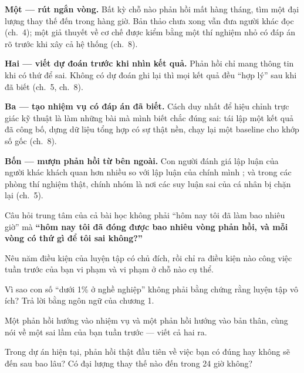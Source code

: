 \documentclass[../hieu-suat.tex]{subfiles}
\begin{document}
\textbf{Một --- rút ngắn vòng.} Bất kỳ chỗ nào phản hồi mất hàng tháng, tìm một đại lượng thay thế đến trong hàng giờ. Bản thảo chưa xong vẫn đưa người khác đọc (ch.~4); một giả thuyết về cơ chế được kiểm bằng một thí nghiệm nhỏ có đáp án rõ trước khi xây cả hệ thống (ch.~8).

\textbf{Hai --- viết dự đoán trước khi nhìn kết quả.} Phản hồi chỉ mang thông tin khi có thứ để sai. Không có dự đoán ghi lại thì mọi kết quả đều ``hợp lý'' sau khi đã biết (ch.~5, ch.~8).

\textbf{Ba --- tạo nhiệm vụ có đáp án đã biết.} Cách duy nhất để hiệu chỉnh trực giác kỹ thuật là làm những bài mà mình biết chắc đúng sai: tái lập một kết quả đã công bố, dựng dữ liệu tổng hợp có sự thật nền, chạy lại một baseline cho khớp số gốc (ch.~8).

\textbf{Bốn --- mượn phản hồi từ bên ngoài.} Con người đánh giá lập luận của người khác khách quan hơn nhiều so với lập luận của chính mình \cite{mercier2011}; và trong các phòng thí nghiệm thật, chính nhóm là nơi các suy luận sai của cá nhân bị chặn lại \cite{dunbar1997} (ch.~5).

\begin{cannho}
Câu hỏi trung tâm của cả bài học không phải ``hôm nay tôi đã làm bao nhiêu giờ'' mà \textbf{``hôm nay tôi đã đóng được bao nhiêu vòng phản hồi, và mỗi vòng có thứ gì để tôi sai không?''}
\end{cannho}

\begin{traloi}
\end{traloi}

\begin{tukiem}
\item Nêu năm điều kiện của luyện tập có chủ đích, rồi chỉ ra điều kiện nào công việc tuần trước của bạn vi phạm và vi phạm ở chỗ nào cụ thể.
\item Vì sao con số ``dưới 1\% ở nghề nghiệp'' không phải bằng chứng rằng luyện tập vô ích? Trả lời bằng ngôn ngữ của chương 1.
\item Một phản hồi hướng vào nhiệm vụ và một phản hồi hướng vào bản thân, cùng nói về một sai lầm của bạn tuần trước --- viết cả hai ra.
\item Trong dự án hiện tại, phản hồi thật đầu tiên về việc bạn có đúng hay không sẽ đến sau bao lâu? Có đại lượng thay thế nào đến trong 24 giờ không?
\end{tukiem}
\end{document}
